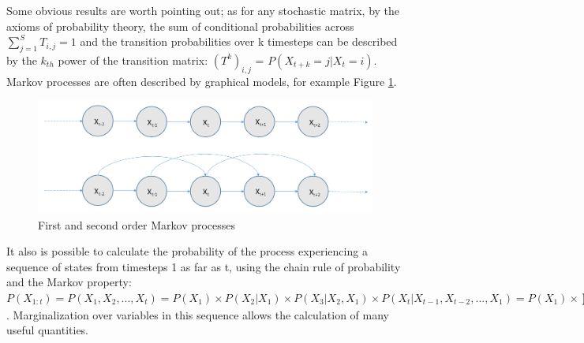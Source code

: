 Some obvious results are worth pointing out; as for any stochastic matrix, by the axioms of probability theory, the sum of conditional probabilities across {$\displaystyle \sum _{j=1}^{S}T_{i,j}=1$} and the transition probabilities over k timesteps can be described by the $k_{th}$ power of the transition matrix: ${(T^k)}_{i,j}$ = $P(X_{t+k} = j | X_{t} = i)$. Markov processes are often described by graphical models, for example Figure \ref{fig:markov-processes}.
\begin{figure}[b]
    \centering
    \includegraphics[width=0.8\linewidth]{Chapters/MultiAgentTargetDetection/BayesianFiltering/Figs/MarkovProcesses/MarkovProcesses.png}
    \caption{First and second order Markov processes \cite{AIAMA}}
    \label{fig:markov-processes}
\end{figure}
It also is possible to calculate the probability of the process experiencing a sequence of states from timesteps 1 as far as t, using the chain rule of probability and the Markov property:
$P(X_{1:t}) = P(X_1, X_2, ..., X_t) = P(X_1)\times P(X_2 | X_1)\times P(X_3 | X_2, X_1) \times P(X_t | X_{t-1}, X_{t-2}, ... , X_1) = P(X_1) \times \prod_{i=2}^{t}{P(X_i | x_{i-1})}$. Marginalization over variables in this sequence allows the calculation of many useful quantities.
\par

